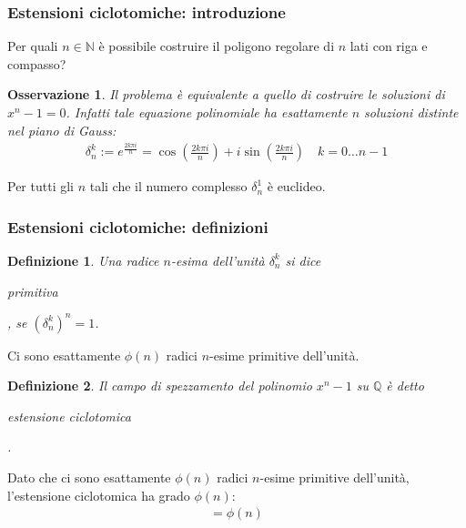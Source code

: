 \documentclass[11pt]{beamer}
\newtheorem{definizione}{Definizione}
\newtheorem{osservazione}{Osservazione}
\begin{document}
\begin{frame}
\frametitle{Estensioni ciclotomiche: introduzione}
\begin{center}
Per quali $n \in \mathbb{N}$ è possibile costruire il poligono regolare di $n$ lati con riga e compasso?
\end{center}
\begin{osservazione}
Il problema è equivalente a quello di costruire le soluzioni di $x^n - 1 = 0$. Infatti tale equazione polinomiale ha esattamente $n$ soluzioni distinte nel piano di Gauss: 
\begin{align*} 
\delta_{n}^{k} := e^{\frac{2k\pi i}{n}} = \cos(\frac{2k\pi i}{n}) + i \sin(\frac{2k\pi i}{n})  \quad k = 0 \dots n-1
\end{align*}
\end{osservazione}
\begin{center}
Per tutti gli $n$ tali che il numero complesso $\delta_{n}^{1}$ è euclideo.
\end{center}
\end{frame}




\begin{frame}
\frametitle{Estensioni ciclotomiche: definizioni}

\begin{definizione}
Una radice $n$-esima dell'unità $\delta_{n}^{k}$ si dice \begin{bfseries}primitiva\end{bfseries}, se $(\delta_{n}^{k})^n = 1$. 
\end{definizione}

\begin{center}
Ci sono esattamente $\phi(n)$ radici $n$-esime primitive dell'unità.
\end{center}

\begin{definizione} 
Il campo di spezzamento del polinomio $x^n - 1$ su $\mathbb{Q}$ è detto \begin{bfseries}estensione ciclotomica\end{bfseries}. 
\end{definizione}

\begin{center}
Dato che ci sono esattamente $\phi(n)$ radici $n$-esime primitive dell'unità, l'estensione ciclotomica ha grado $\phi(n)$:
\begin{align*} 
[\mathbb{Q}(\delta_{n}^{1}): \mathbb{Q}] = \phi(n)
\end{align*}
\end{center}
\end{frame}
\end{document}
